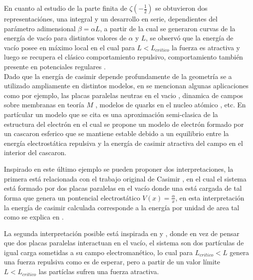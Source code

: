 En cuanto al estudio de la parte finita de $\zeta \left( - \frac{1}{2} \right)$ se obtuvieron dos representaciónes, una integral y un desarrollo en serie, dependientes del parámetro adimensional $\beta = \alpha L$, a partir de la cual se generaron curvas de la energía de vacío para distintos valores de $\alpha$ y $L$, se observó que la energía de vacío posee en máximo local en el cual para  $L < L _{critico} $ la fuerza es atractiva y luego se recupera el clásico comportamiento repulsivo, comportamiento también presente en potenciales regulares \cite{Beauregard_2013}.\\

Dado que la energía de casimir depende profundamente de la geometría se a utilizado ampliamente en distintos modelos, en \cite{Blau_1988} se mencionan algunas aplicaciones como por ejemplo, las placas paralelas neutras en el vacio \cite{PLUNIEN198687}, dinamica de campos sobre membranas en teoría $M$ \cite{DEWIT1988545}, modelos de quarks en el nucleo atómico \cite{PhysRevD.14.2622}, etc. En partícular un modelo que se cita es una aproximación semi-clasica de la estructura del electrón \cite{MILTON198049} en el cual se propone un modelo de electrón formado por un cascaron esferico que se mantiene estable debido a un equilibrio entre la  energía electrostática repulsiva y la energía de casimir atractiva del campo en el interior del cascaron.

Inspirado en este último ejemplo se pueden proponer dos interpretaciones, la primera está relacionada con el trabajo original de Casimir \cite{Casimir:1948dh}, en el cual el sistema está formado por dos placas paralelas en el vacío donde una está cargada de tal forma que genera un pontencial electrostático $V (x) = \frac{\alpha}{x}$, en esta interpretación la energía de casimir calculada corresponde a la energía por unidad de area tal como se explica en \cite{Blau_1988}.

La segunda interpretación posible está inspirada en \cite{MILTON198049} y \cite{Beauregard_2013}, donde en vez de pensar que dos placas paralelas interactuan en el vacío, el sistema son dos partículas de igual carga sometidas a su campo electromanético, lo cual para $L _{critico} < L$ genera una fuerza repulsiva como es de esperar, pero a partir de un valor límite $L < L _{critico}$ las partíclas sufren una fuerza atractiva.









